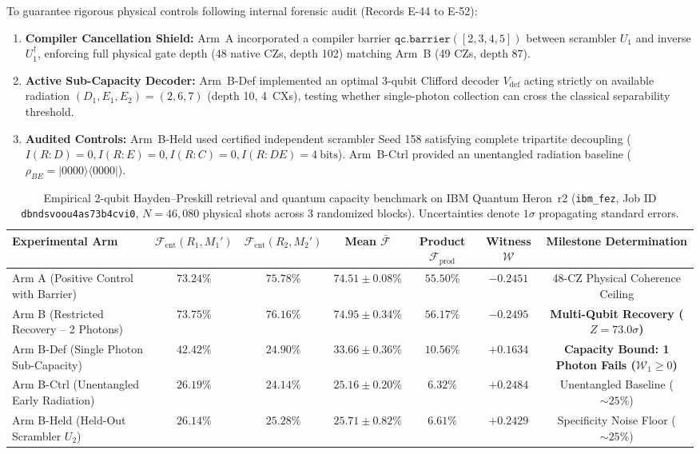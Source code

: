\documentclass[aps,preprint,superscriptaddress,longbibliography]{revtex4-2}
\begin{document}
To guarantee rigorous physical controls following internal forensic audit (Records E-44 to E-52):
\begin{enumerate}
\item \textbf{Compiler Cancellation Shield:} Arm~A incorporated a compiler barrier $\texttt{qc.barrier}([2, 3, 4, 5])$ between scrambler $U_1$ and inverse $U_1^\dagger$, enforcing full physical gate depth (48 native CZs, depth 102) matching Arm~B (49 CZs, depth 87).
\item \textbf{Active Sub-Capacity Decoder:} Arm~B-Def implemented an optimal 3-qubit Clifford decoder $V_{\mathrm{def}}$ acting strictly on available radiation $(D_1, E_1, E_2) = (2, 6, 7)$ (depth 10, 4~CXs), testing whether single-photon collection can cross the classical separability threshold.
\item \textbf{Audited Controls:} Arm~B-Held used certified independent scrambler Seed 158 satisfying complete tripartite decoupling ($I(R:D) = 0, I(R:E) = 0, I(R:C) = 0, I(R:DE) = 4\ \text{bits}$). Arm~B-Ctrl provided an unentangled radiation baseline ($\rho_{BE} = |0000\rangle\langle 0000|$).
\end{enumerate}

\begin{table}[H]
\centering
\caption{Empirical 2-qubit Hayden--Preskill retrieval and quantum capacity benchmark on IBM Quantum Heron~r2 (\texttt{ibm\_fez}, Job ID \texttt{dbndsvoou4as73b4cvi0}, $N = 46{,}080$ physical shots across 3 randomized blocks). Uncertainties denote $1\sigma$ propagating standard errors.}
\label{tab:hp_multiqubit_results}
\begin{tabular}{lcccccc}
\toprule
Experimental Arm & $\mathcal{F}_{\mathrm{ent}}(R_1, M_1')$ & $\mathcal{F}_{\mathrm{ent}}(R_2, M_2')$ & Mean $\bar{\mathcal{F}}$ & Product $\mathcal{F}_{\mathrm{prod}}$ & Witness $\mathcal{W}$ & Milestone Determination \\
\midrule
Arm A (Positive Control with Barrier) & $73.24\%$ & $75.78\%$ & $\mathbf{74.51 \pm 0.08\%}$ & $55.50\%$ & $-0.2451$ & 48-CZ Physical Coherence Ceiling \\
Arm B (Restricted Recovery -- 2 Photons) & $73.75\%$ & $76.16\%$ & $\mathbf{74.95 \pm 0.34\%}$ & $\mathbf{56.17\%}$ & $\mathbf{-0.2495}$ & \textbf{Multi-Qubit Recovery ($Z = 73.0\sigma$)} \\
Arm B-Def (Single Photon Sub-Capacity) & $42.42\%$ & $24.90\%$ & $33.66 \pm 0.36\%$ & $10.56\%$ & $+0.1634$ & \textbf{Capacity Bound: 1 Photon Fails ($\mathcal{W}_1 \ge 0$)} \\
Arm B-Ctrl (Unentangled Early Radiation) & $26.19\%$ & $24.14\%$ & $25.16 \pm 0.20\%$ & $6.32\%$ & $+0.2484$ & Unentangled Baseline ($\sim 25\%$) \\
Arm B-Held (Held-Out Scrambler $U_2$) & $26.14\%$ & $25.28\%$ & $25.71 \pm 0.82\%$ & $6.61\%$ & $+0.2429$ & Specificity Noise Floor ($\sim 25\%$) \\
\bottomrule
\end{tabular}
\end{table}
\end{document}
